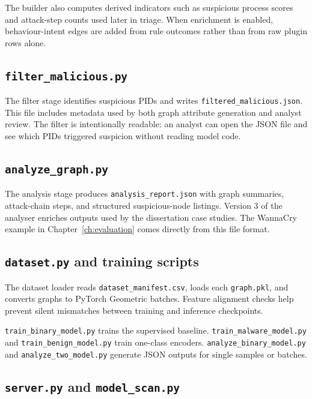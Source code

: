 The builder also computes derived indicators such as suspicious process scores and attack-step counts used later in triage. When enrichment is enabled, behaviour-intent edges are added from rule outcomes rather than from raw plugin rows alone.

\subsection{\texttt{filter\_malicious.py}}

The filter stage identifies suspicious PIDs and writes \texttt{filtered\_malicious.json}. This file includes metadata used by both graph attribute generation and analyst review. The filter is intentionally readable: an analyst can open the JSON file and see which PIDs triggered suspicion without reading model code.

\subsection{\texttt{analyze\_graph.py}}

The analysis stage produces \texttt{analysis\_report.json} with graph summaries, attack-chain steps, and structured suspicious-node listings. Version 3 of the analyser enriches outputs used by the dissertation case studies. The WannaCry example in Chapter~\ref{ch:evaluation} comes directly from this file format.

\subsection{\texttt{dataset.py} and training scripts}

The dataset loader reads \texttt{dataset\_manifest.csv}, loads each \texttt{graph.pkl}, and converts graphs to PyTorch Geometric batches. Feature alignment checks help prevent silent mismatches between training and inference checkpoints.

\texttt{train\_binary\_model.py} trains the supervised baseline. \texttt{train\_malware\_model.py} and \texttt{train\_benign\_model.py} train one-class encoders. \texttt{analyze\_binary\_model.py} and \texttt{analyze\_two\_model.py} generate JSON outputs for single samples or batches.

\subsection{\texttt{server.py} and \texttt{model\_scan.py}}

